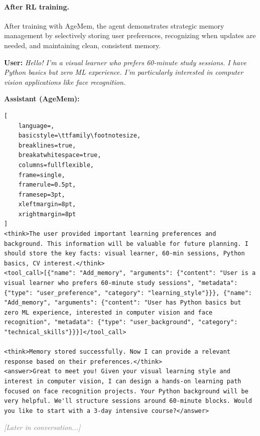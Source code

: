 \paragraph{After RL training.}
After training with AgeMem, the agent demonstrates strategic memory management by selectively storing user preferences, recognizing when updates are needed, and maintaining clean, consistent memory.

\vspace{0.3cm}
\noindent\textbf{User:} \textit{Hello! I'm a visual learner who prefers 60-minute study sessions. I have Python basics but zero ML experience. I'm particularly interested in computer vision applications like face recognition.}

\vspace{0.2cm}
\noindent\textbf{Assistant (AgeMem):}
\begin{footnotesize}
\begin{lstlisting}[
    language=,
    basicstyle=\ttfamily\footnotesize,
    breaklines=true,
    breakatwhitespace=true,
    columns=fullflexible,
    frame=single,
    framerule=0.5pt,
    framesep=3pt,
    xleftmargin=8pt,
    xrightmargin=8pt
]
<think>The user provided important learning preferences and background. This information will be valuable for future planning. I should store the key facts: visual learner, 60-min sessions, Python basics, CV interest.</think>
<tool_call>[{"name": "Add_memory", "arguments": {"content": "User is a visual learner who prefers 60-minute study sessions", "metadata": {"type": "user_preference", "category": "learning_style"}}}, {"name": "Add_memory", "arguments": {"content": "User has Python basics but zero ML experience, interested in computer vision and face recognition", "metadata": {"type": "user_background", "category": "technical_skills"}}}]</tool_call>

<think>Memory stored successfully. Now I can provide a relevant response based on their preferences.</think>
<answer>Great to meet you! Given your visual learning style and interest in computer vision, I can design a hands-on learning path focused on face recognition projects. Your Python background will be very helpful. We'll structure sessions around 60-minute blocks. Would you like to start with a 3-day intensive course?</answer>
\end{lstlisting}
\end{footnotesize}

\vspace{0.25cm}
\noindent\textcolor{gray}{\textit{[Later in conversation...]}}


